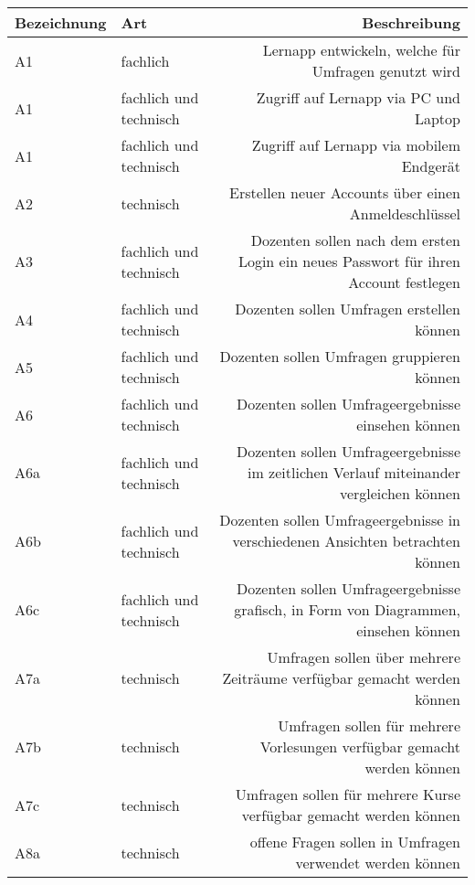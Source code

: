 \begin{table}[!htbp]
    \centering
    \begin{tabularx}{\textwidth}{|l|k|r|}
      \hline
      {Bezeichnung} & {Art} & {Beschreibung} \\
      \hline \hline
      {\label{Anf:A1}A1} & fachlich & Lernapp entwickeln, welche für Umfragen genutzt wird \\
      \hline
      {\label{Anf:A1}A1} & fachlich und technisch & Zugriff auf Lernapp via PC und Laptop \\
      \hline
      {\label{Anf:A1}A1} & fachlich und technisch & Zugriff auf Lernapp via mobilem Endgerät \\
      \hline
      {\label{Anf:A2}A2} & technisch & Erstellen neuer Accounts über einen Anmeldeschlüssel \\
      \hline
      {\label{Anf:A3}A3} & fachlich und technisch & Dozenten sollen nach dem ersten Login ein neues Passwort für ihren Account festlegen \\
      \hline
      {\label{Anf:A4}A4} & fachlich und technisch & Dozenten sollen Umfragen erstellen können\\
      \hline
      {\label{Anf:A5}A5} & fachlich und technisch & Dozenten sollen Umfragen gruppieren können\\
      \hline
      {\label{Anf:A6}A6} & fachlich und technisch & Dozenten sollen Umfrageergebnisse einsehen können\\
      \hline
      {\label{Anf:A6a}A6a} & fachlich und technisch & Dozenten sollen Umfrageergebnisse im zeitlichen Verlauf miteinander vergleichen können\\
      \hline
      {\label{Anf:A6b}A6b} & fachlich und technisch & Dozenten sollen Umfrageergebnisse in verschiedenen Ansichten betrachten können\\
      \hline
      {\label{Anf:A6c}A6c} & fachlich und technisch & Dozenten sollen Umfrageergebnisse grafisch, in Form von Diagrammen, einsehen können\\
      \hline
      {\label{Anf:A7a}A7a} & technisch & Umfragen sollen über mehrere Zeiträume verfügbar gemacht werden können \\
      \hline
      {\label{Anf:A7b}A7b} & technisch & Umfragen sollen für mehrere Vorlesungen verfügbar gemacht werden können \\
      \hline
      {\label{Anf:A7c}A7c} & technisch & Umfragen sollen für mehrere Kurse verfügbar gemacht werden können \\
      \hline
      {\label{Anf:A8a}A8a} & technisch & offene Fragen sollen in Umfragen verwendet werden können \\

\end{tabularx}
\end{table}
